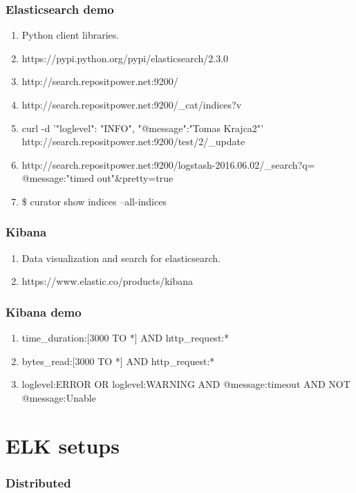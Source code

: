 \documentclass[13pt, ignorenonframetext]{beamer}
\begin{document}
\begin{frame}
\frametitle{Elasticsearch demo}
\begin{enumerate}
\item Python client libraries. 
\item https://pypi.python.org/pypi/elasticsearch/2.3.0
\item http://search.repositpower.net:9200/
\item http://search.repositpower.net:9200/\_cat/indices?v
\item curl -d '{"loglevel": "INFO", "@message":"Tomas Krajca2"}' http://search.repositpower.net:9200/test/2/\_update
\item http://search.repositpower.net:9200/logstash-2016.06.02/\_search?q=
      @message:"timed out"\&pretty=true
\item \$ curator show indices --all-indices
\end{enumerate}
\end{frame}

\begin{frame}
\frametitle{Kibana}
\begin{enumerate}
\item Data visualization and search for elasticsearch.
\item https://www.elastic.co/products/kibana
\end{enumerate}
\end{frame}


\begin{frame}
\frametitle{Kibana demo}
\begin{enumerate}
\item time\_duration:[3000 TO *] AND http\_request:*
\item bytes\_read:[3000 TO *] AND http\_request:*
\item loglevel:ERROR OR loglevel:WARNING AND @message:timeout AND NOT @message:Unable
\end{enumerate}
\end{frame}


\section{ELK setups}
\begin{frame}
\frametitle{Distributed}
\end{frame}
\end{document}
